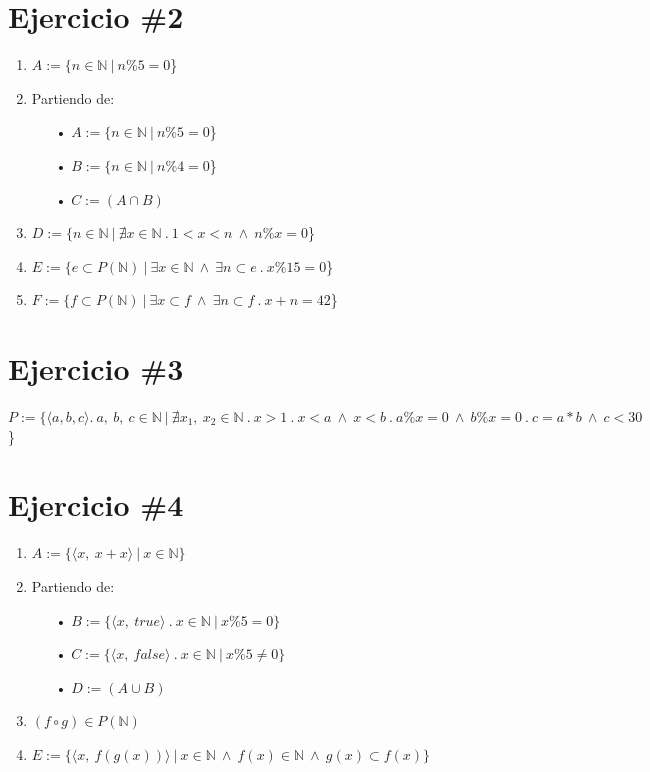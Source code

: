 \documentclass[11pt,letterpaper]{article}
\begin{document}
\section{Ejercicio \#2}
\begin{enumerate}
\item $A:=\{n \in \mathbb{N}\ |\ n\%5=0 $\}

\item Partiendo de:
\begin{itemize}
\item[•] $A:=\{n \in \mathbb{N}\ |\ n\%5=0 $\}
\item[•] $B:=\{n \in \mathbb{N}\ |\ n\%4=0 $\} \\

\item[•]$C:=(A \cap B)$
\end{itemize}

\item $D:=\{n \in \mathbb{N}\ |\ \nexists x \in \mathbb{N}\ .\ 1<x<n\ \wedge\ n\%x=0$\}

\item $E:=\{e \subset P(\mathbb{N})\ |\ \exists x \in \mathbb{N}\ \wedge\ \exists n \subset e\ .\ x\%15=0$\} 

\item{{$F:=\{f \subset P(\mathbb{N})\ |\ \exists x \subset f\ \wedge\ \exists n \subset f\ .\ x+n=42$\}}}
\end{enumerate}


\section{Ejercicio \#3}
$P:=\{ \langle a,b,c \rangle .\ a,\ b,\ c \in \mathbb{N}\ |\ \nexists x_1,\ x_2 \in \mathbb{N}\ .\ x>1\ .\ x<a\ \wedge\ x<b\ .\ a\%x=0\ \wedge\ b\%x=0\ .\ c=a*b\ \wedge\ c<30$\}


\section{Ejercicio \#4}
\begin{enumerate}
\item $A:=\{ \langle x,\ x+x \rangle \ |\ x \in \mathbb{N}\}$

\item Partiendo de:
\begin{itemize}
\item[•] $B:=\{ \langle x,\ true \rangle \ .\ x \in \mathbb{N}\ |\ x\%5=0\}$
\item[•] $C:=\{ \langle x,\ false \rangle \ .\ x \in \mathbb{N}\ |\ x\%5 \ne 0 \}$\\
\item[•] $D:=(A \cup B)$
\end{itemize}

\item $(f \circ g) \in P(\mathbb{N})$

\item $E:=\{ \langle x,\ f(g(x)) \rangle \ |\ x \in \mathbb{N}\ \wedge\ f(x) \in \mathbb{N}\ \wedge\ g(x) \subset f(x)\}$
\end{enumerate}
\end{document}
